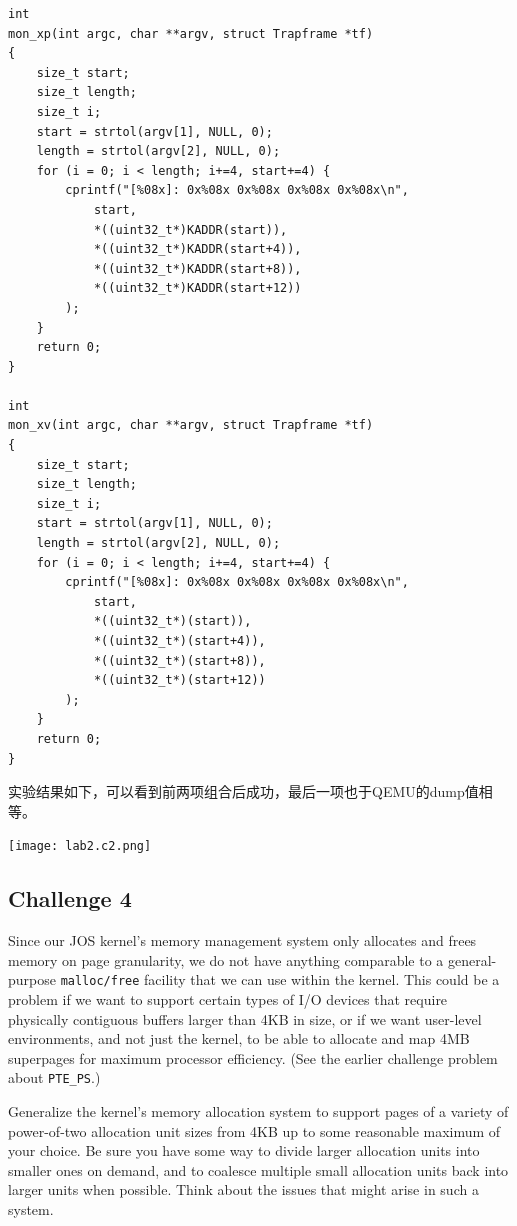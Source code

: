 \documentclass[11pt]{article}
\begin{document}
\begin{lstlisting}[title=monitor.c]
int
mon_xp(int argc, char **argv, struct Trapframe *tf)
{
	size_t start;
	size_t length;
	size_t i;
	start = strtol(argv[1], NULL, 0);
	length = strtol(argv[2], NULL, 0);
	for (i = 0; i < length; i+=4, start+=4) {
		cprintf("[%08x]: 0x%08x 0x%08x 0x%08x 0x%08x\n", 
			start, 
			*((uint32_t*)KADDR(start)),
			*((uint32_t*)KADDR(start+4)),
			*((uint32_t*)KADDR(start+8)),
			*((uint32_t*)KADDR(start+12))
		);
	}
	return 0;
}

int
mon_xv(int argc, char **argv, struct Trapframe *tf)
{
	size_t start;
	size_t length;
	size_t i;
	start = strtol(argv[1], NULL, 0);
	length = strtol(argv[2], NULL, 0);
	for (i = 0; i < length; i+=4, start+=4) {
		cprintf("[%08x]: 0x%08x 0x%08x 0x%08x 0x%08x\n", 
			start, 
			*((uint32_t*)(start)),
			*((uint32_t*)(start+4)),
			*((uint32_t*)(start+8)),
			*((uint32_t*)(start+12))
		);
	}
	return 0;
}
\end{lstlisting}

实验结果如下，可以看到前两项组合后成功，最后一项也于QEMU的dump值相等。

\begin{center}
\texttt{[image: lab2.c2.png]}
\end{center}

\subsection{Challenge 4}
\begin{framed}
Since our JOS kernel's memory management system only allocates and frees memory on page granularity, we do not have anything comparable to a general-purpose \lstinline|malloc/free| facility that we can use within the kernel. This could be a problem if we want to support certain types of I/O devices that require physically contiguous buffers larger than 4KB in size, or if we want user-level environments, and not just the kernel, to be able to allocate and map 4MB superpages for maximum processor efficiency. (See the earlier challenge problem about \lstinline|PTE_PS|.)

Generalize the kernel's memory allocation system to support pages of a variety of power-of-two allocation unit sizes from 4KB up to some reasonable maximum of your choice. Be sure you have some way to divide larger allocation units into smaller ones on demand, and to coalesce multiple small allocation units back into larger units when possible. Think about the issues that might arise in such a system. 
\end{framed}
\end{document}

